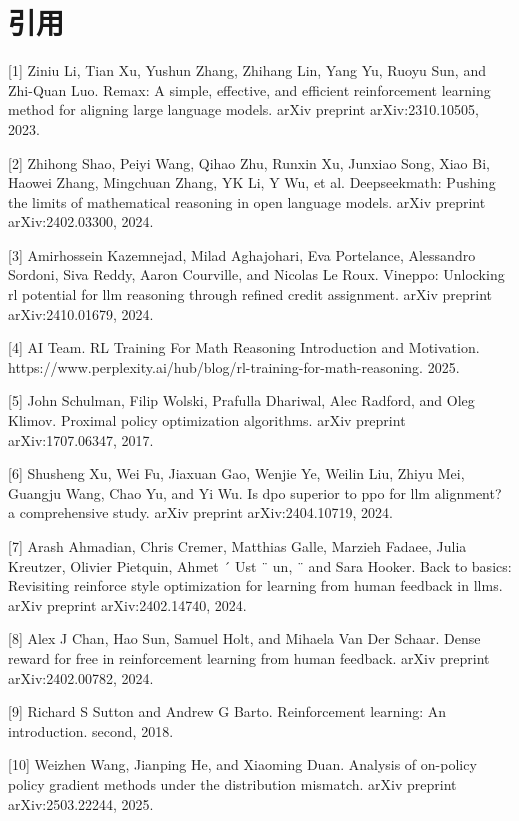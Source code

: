 \documentclass[11pt,english]{ctexart}
\begin{document}
\section{引用}
[1] Ziniu Li, Tian Xu, Yushun Zhang, Zhihang Lin, Yang Yu, Ruoyu Sun, and Zhi-Quan Luo. Remax: A simple, effective, and efficient reinforcement learning method for aligning large language models. arXiv preprint arXiv:2310.10505, 2023.

[2] Zhihong Shao, Peiyi Wang, Qihao Zhu, Runxin Xu, Junxiao Song, Xiao Bi, Haowei Zhang, Mingchuan Zhang,
YK Li, Y Wu, et al. Deepseekmath: Pushing the limits of mathematical reasoning in open language models. arXiv preprint arXiv:2402.03300, 2024.

[3] Amirhossein Kazemnejad, Milad Aghajohari, Eva Portelance, Alessandro Sordoni, Siva Reddy, Aaron Courville, and Nicolas Le Roux. Vineppo: Unlocking rl potential for llm reasoning through refined credit assignment. arXiv preprint arXiv:2410.01679, 2024.

[4] AI Team. RL Training For Math Reasoning Introduction and Motivation. https://www.perplexity.ai/hub/blog/rl-training-for-math-reasoning. 2025.

[5] John Schulman, Filip Wolski, Prafulla Dhariwal, Alec Radford, and Oleg Klimov. Proximal policy optimization algorithms. arXiv preprint arXiv:1707.06347, 2017.

[6]  Shusheng Xu, Wei Fu, Jiaxuan Gao, Wenjie Ye, Weilin Liu, Zhiyu Mei, Guangju Wang, Chao Yu, and Yi Wu. Is dpo superior to ppo for llm alignment? a comprehensive study. arXiv preprint arXiv:2404.10719, 2024.

[7] Arash Ahmadian, Chris Cremer, Matthias Galle, Marzieh Fadaee, Julia Kreutzer, Olivier Pietquin, Ahmet ´ Ust ¨ un, ¨ and Sara Hooker. Back to basics: Revisiting reinforce style optimization for learning from human feedback in llms. arXiv preprint arXiv:2402.14740, 2024.

[8] Alex J Chan, Hao Sun, Samuel Holt, and Mihaela Van Der Schaar. Dense reward for free in reinforcement learning from human feedback. arXiv preprint arXiv:2402.00782, 2024.

[9] Richard S Sutton and Andrew G Barto. Reinforcement learning: An introduction. second, 2018.

[10] Weizhen Wang, Jianping He, and Xiaoming Duan. Analysis of on-policy policy gradient methods under the distribution mismatch. arXiv preprint arXiv:2503.22244, 2025.
\end{document}
